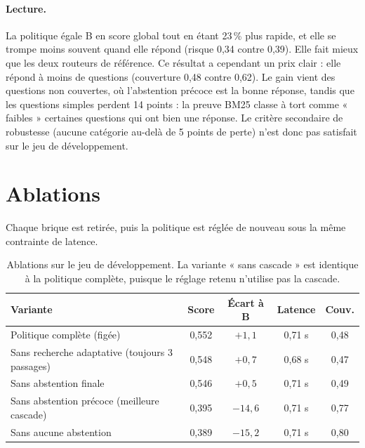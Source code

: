 \documentclass[11pt,a4paper]{article}
\begin{document}
\paragraph{Lecture.} La politique égale B en score global tout en étant 23\,\% plus rapide, et elle se
trompe moins souvent quand elle répond (risque 0,34 contre 0,39). Elle fait mieux que les deux routeurs
de référence. Ce résultat a cependant un prix clair : elle répond à moins de questions (couverture 0,48
contre 0,62). Le gain vient des questions non couvertes, où l'abstention précoce est la bonne réponse,
tandis que les questions simples perdent 14 points : la preuve BM25 classe à tort comme « faibles »
certaines questions qui ont bien une réponse. Le critère secondaire de robustesse (aucune catégorie au-delà
de 5 points de perte) n'est donc pas satisfait sur le jeu de développement.

\section{Ablations}\label{sec:ablations}

Chaque brique est retirée, puis la politique est réglée de nouveau sous la même contrainte de latence.

\begin{table}[H]
\centering\small
\begin{tabular}{l c c c c}
\toprule
\textbf{Variante} & \textbf{Score} & \textbf{Écart à B} & \textbf{Latence} & \textbf{Couv.} \\
\midrule
Politique complète (figée) & 0,552 & $+1{,}1$ & 0,71 s & 0,48 \\
Sans recherche adaptative (toujours 3 passages) & 0,548 & $+0{,}7$ & 0,68 s & 0,47 \\
Sans abstention finale & 0,546 & $+0{,}5$ & 0,71 s & 0,49 \\
Sans abstention précoce (meilleure cascade) & 0,395 & $-14{,}6$ & 0,71 s & 0,77 \\
Sans aucune abstention & 0,389 & $-15{,}2$ & 0,71 s & 0,80 \\
\bottomrule
\end{tabular}
\caption{Ablations sur le jeu de développement. La variante « sans cascade » est identique à la politique
complète, puisque le réglage retenu n'utilise pas la cascade.}
\label{tab:ablations}
\end{table}
\end{document}
